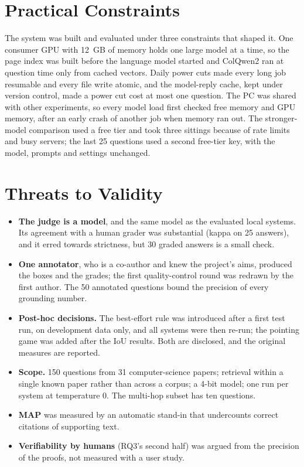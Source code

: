 \section{Practical Constraints}

The system was built and evaluated under three constraints that shaped it. One
consumer GPU with 12~GB of memory holds one large model at a time, so the page index
was built before the language model started and ColQwen2 ran at question time only
from cached vectors. Daily power cuts made every long job resumable and every file
write atomic, and the model-reply cache, kept under version control, made a power cut
cost at most one question. The PC was shared with other experiments, so every model
load first checked free memory and GPU memory, after an early crash of another job
when memory ran out. The stronger-model comparison used a free tier and took three
sittings because of rate limits and busy servers; the last 25 questions used a second
free-tier key, with the model, prompts and settings unchanged.

\section{Threats to Validity}

\begin{itemize}
    \item \textbf{The judge is a model}, and the same model as the evaluated local
    systems. Its agreement with a human grader was substantial (kappa \nJudgeKappa{} on
    25 answers), and it erred towards strictness, but 30 graded answers is a small check.
    \item \textbf{One annotator}, who is a co-author and knew the project's aims,
    produced the boxes and the grades; the first quality-control round was redrawn by
    the first author. The 50 annotated questions bound the precision of every grounding
    number.
    \item \textbf{Post-hoc decisions.} The best-effort rule was introduced after a first
    test run, on development data only, and all systems were then re-run; the pointing
    game was added after the IoU results. Both are disclosed, and the original
    measures are reported.
    \item \textbf{Scope.} 150 questions from 31 computer-science papers; retrieval
    within a single known paper rather than across a corpus; a 4-bit model; one run per
    system at temperature 0. The multi-hop subset has ten questions.
    \item \textbf{MAP} was measured by an automatic stand-in that undercounts correct
    citations of supporting text.
    \item \textbf{Verifiability by humans} (RQ3's second half) was argued from the
    precision of the proofs, not measured with a user study.
\end{itemize}
